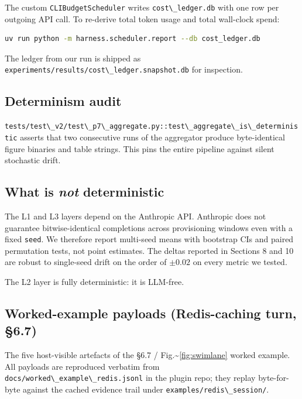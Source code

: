 The custom \passthrough{\lstinline!CLIBudgetScheduler!} writes \passthrough{\lstinline!cost\_ledger.db!} with one row per outgoing API call. To re-derive total token usage and total wall-clock spend:

\begin{lstlisting}[language=bash]
uv run python -m harness.scheduler.report --db cost_ledger.db
\end{lstlisting}

The ledger from our run is shipped as \passthrough{\lstinline!experiments/results/cost\_ledger.snapshot.db!} for inspection.

\subsection{Determinism audit}\label{determinism-audit}

\passthrough{\lstinline!tests/test\_v2/test\_p7\_aggregate.py::test\_aggregate\_is\_deterministic!} asserts that two consecutive runs of the aggregator produce byte-identical figure binaries and table strings. This pins the entire pipeline against silent stochastic drift.

\subsection{\texorpdfstring{What is \emph{not} deterministic}{What is not deterministic}}\label{what-is-not-deterministic}

The L1 and L3 layers depend on the Anthropic API. Anthropic does not guarantee bitwise-identical completions across provisioning windows even with a fixed \passthrough{\lstinline!seed!}. We therefore report multi-seed means with bootstrap CIs and paired permutation tests, not point estimates. The deltas reported in Sections 8 and 10 are robust to single-seed drift on the order of \(\pm 0.02\) on every metric we tested.

The L2 layer is fully deterministic: it is LLM-free.

\subsection{Worked-example payloads (Redis-caching turn, §6.7)}\label{worked-example-payloads-redis-caching-turn-6.7}

The five host-visible artefacts of the §6.7 / Fig.\textasciitilde{}\ref{fig:swimlane} worked example. All payloads are reproduced verbatim from \passthrough{\lstinline!docs/worked\_example\_redis.jsonl!} in the plugin repo; they replay byte-for-byte against the cached evidence trail under \passthrough{\lstinline!examples/redis\_session/!}.

